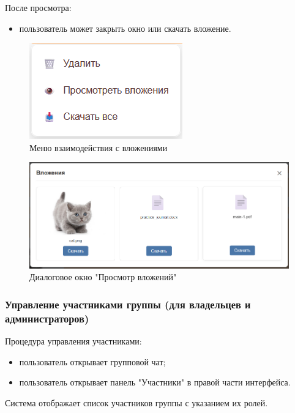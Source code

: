 После просмотра:
\begin{itemize}
	\item пользователь может закрыть окно или скачать вложение.
\end{itemize}

\begin{figure}[H]
	\centering
	\includegraphics[width=0.7\linewidth]{"images/Меню взаимодействия с вложениями"}
	\caption{Меню взаимодействия с вложениями}
	\label{fig:attachment-menu}
\end{figure}

\begin{figure}[h]
	\centering
	\includegraphics[width=0.8\linewidth]{"images/Окно просмотра вложений"}
	\caption{Диалоговое окно "Просмотр вложений"}
	\label{fig:attachment-view}
\end{figure}

\subsubsection{Управление участниками группы (для владельцев и администраторов)}
Процедура управления участниками:
\begin{itemize}
	\item пользователь открывает групповой чат;
	\item пользователь открывает панель "Участники" в правой части интерфейса.
\end{itemize}

Система отображает список участников группы с указанием их ролей.

